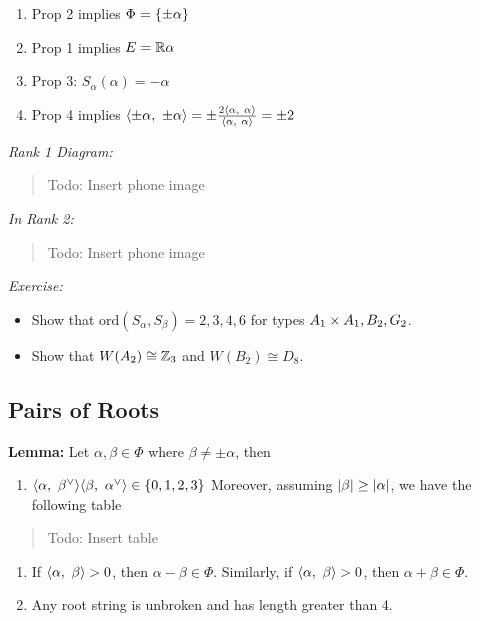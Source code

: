 \begin{enumerate}
\def\labelenumi{\arabic{enumi}.}
\tightlist
\item
  Prop 2 implies \(\Phi = \left\{{\pm \alpha}\right\}\)
\item
  Prop 1 implies \(E = {\mathbb{R}} \alpha\)
\item
  Prop 3: \(S_\alpha(\alpha) = -\alpha\)
\item
  Prop 4 implies
  \({\left\langle {\pm\alpha},~{\pm\alpha} \right\rangle} = \pm \frac {2{\left\langle {\alpha},~{\alpha} \right\rangle}} {{\left\langle {\alpha},~{\alpha} \right\rangle}} = \pm 2\)
\end{enumerate}

\emph{Rank 1 Diagram:}

\begin{quote}
Todo: Insert phone image
\end{quote}

\emph{In Rank 2:}

\begin{quote}
Todo: Insert phone image
\end{quote}

\emph{Exercise:}

\begin{itemize}
\tightlist
\item
  Show that \(\mathrm{ord}(S_\alpha, S_\beta) = 2,3,4,6\) for types
  \(A_1 \times A_1, B_2, G_2\).
\item
  Show that \(W(A_2) \cong {\mathbb{Z}}_3\) and \(W(B_2) \cong D_8\).
\end{itemize}

\hypertarget{pairs-of-roots}{%
\subsection{Pairs of Roots}\label{pairs-of-roots}}

\textbf{Lemma:} Let \(\alpha, \beta \in \Phi\) where
\(\beta \neq \pm \alpha\), then

\begin{enumerate}
\def\labelenumi{\arabic{enumi}.}
\tightlist
\item
  \({\left\langle {\alpha},~{\beta^\vee} \right\rangle} {\left\langle {\beta},~{\alpha^\vee} \right\rangle} \in \left\{{0,1,2,3}\right\}\)
  Moreover, assuming \({\left\lvert {\beta} \right\rvert} \geq {\left\lvert {\alpha} \right\rvert}\), we have the
  following table
\end{enumerate}

\begin{quote}
Todo: Insert table
\end{quote}

\begin{enumerate}
\def\labelenumi{\arabic{enumi}.}
\setcounter{enumi}{1}
\item
  If \({\left\langle {\alpha},~{\beta} \right\rangle} > 0\), then \(\alpha-\beta \in\Phi\).
  Similarly, if \({\left\langle {\alpha},~{\beta} \right\rangle} > 0\), then
  \(\alpha + \beta \in \Phi\).
\item
  Any root string is unbroken and has length greater than 4.
\end{enumerate}

